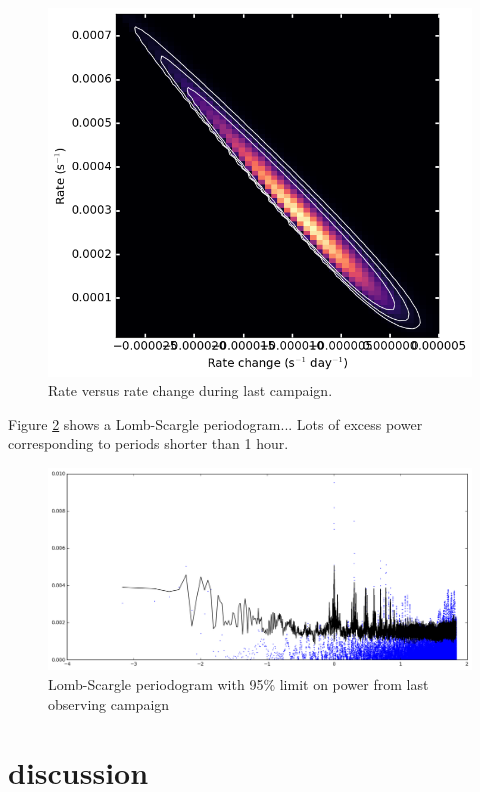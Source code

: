 \documentclass{emulateapj}
\begin{document}
\begin{figure}[htb]
\begin{center}
\includegraphics[width=0.9\columnwidth]{event_rate_contours}
\caption{Rate versus rate change during last campaign.
\label{fig:rate}}
\end{center}
\end{figure}

Figure \ref{fig:ls} shows a Lomb-Scargle periodogram...
Lots of excess power corresponding to periods shorter than 1 hour.

\begin{figure}[htb]
\begin{center}
\includegraphics[width=0.9\columnwidth]{lombscargle}
\caption{Lomb-Scargle periodogram with 95\% limit on power from last observing campaign
\label{fig:ls}}
\end{center}
\end{figure}



\section{discussion}
\end{document}
